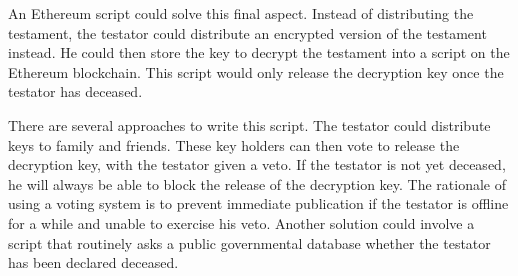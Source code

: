 An Ethereum script could solve this final aspect. Instead of distributing the testament, the testator could distribute an encrypted version of the testament instead. He could then store the key to decrypt the testament into a script on the Ethereum blockchain. This script would only release the decryption key once the testator has deceased.

There are several approaches to write this script. The testator could distribute keys to family and friends. These key holders can then vote to release the decryption key, with the testator given a veto. If the testator is not yet deceased, he will always be able to block the release of the decryption key. The rationale of using a voting system is to prevent immediate publication if the testator is offline for a while and unable to exercise his veto. Another solution could involve a script that routinely asks a public governmental database whether the testator has been declared deceased.

